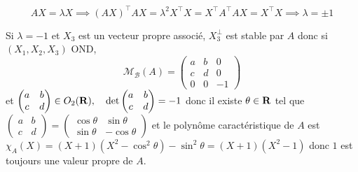 \[
    AX=\lambda X \implies (AX)^\top AX=\lambda ^2 X^\top X=X^\top A^\top AX=X^\top X \implies  \lambda = \pm 1
\]

Si $ \lambda = -1$ et $X_3$ est un vecteur propre associé,  $X_3^\bot$ est stable par $A$ donc si  $(X_1, X_2, X_3)$ OND,
 \[
     \mathcal M_{\mathcal  B}(A)=
\begin{pmatrix}
    a&b&0\\
    c&d&0\\0&0&-1
\end{pmatrix}
\]
et $ \begin{pmatrix}
    a&b\\c&d
\end{pmatrix} \in  O_2(\mathbf R), \quad  \det \begin{pmatrix}
    a&b\\c&d
\end{pmatrix}=-1
$
donc il existe $\theta \in  \mathbf R$ tel que $\begin{pmatrix}
    a&b\\c&d
\end{pmatrix} = \begin{pmatrix}
    \cos \theta&\sin \theta \\
    \sin \theta & -\cos \theta
\end{pmatrix}
$
et le polynôme caractéristique de $A$ est  $\chi_A(X)=(X+1)(X^2 -\cos^2 \theta)-\sin^2 \theta=(X+1)(X^2 -1)$ donc $1$ est toujours une valeur propre de  $A$.
